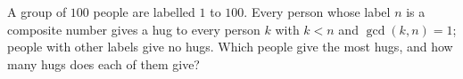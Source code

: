 A group of $100$ people are labelled $1$ to $100$. Every person whose label $n$ is a composite number gives a hug to every person $k$ with $k<n$ and $\gcd(k,n)=1$; people with other labels give no hugs. Which people give the most hugs, and how many hugs does each of them give?
